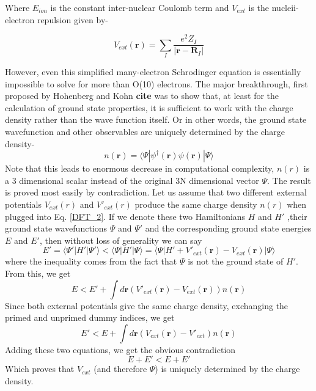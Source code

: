 \documentclass[12pt,letter]{article}
\newcommand{\Ps}{\Psi}
\newcommand{\ps}{\psi}
\newcommand{\da}{\dagger}
\newcommand{\la}{\langle}
\newcommand{\ra}{\rangle}
\newcommand{\rmb}{\mathbf{r}}
\begin{document}
Where $E_{ion}$ is the constant inter-nuclear Coulomb term and $V_{ext}$ is the nucleii-electron repulsion given by-

\begin{equation}
 V_{ext}(\rmb)= \sum_{I} \dfrac{e^2 Z_I}{|\rmb-\mathbf{R}_I|}
 \end{equation} 

However, even this simplified many-electron Schrodinger equation is essentially impossible to solve for more than O(10) electrons. The major breakthrough, first proposed by Hohenberg and Kohn \textbf{cite} was to show that, at least for the calculation of ground state properties, it is sufficient to work with the charge density rather than the wave function itself. Or in other words, the ground state wavefunction and other observables are uniquely determined  by the charge density-
\begin{equation}
n(\rmb)= \la \Ps|\ps^\da (\rmb) \ps(\rmb) | \Ps\ra 
\end{equation}
Note that this leads to enormous decrease in computational complexity, $n(r)$ is a 3 dimensional scalar instead of the original 3N dimensional vector $\Ps$.  The result is proved most easily by contradiction. Let us assume that two different external potentials $V_{ext} (r)$ and $V'_{ext} (r)$ produce the same charge density $n(r)$
when plugged into Eq. \ref{DFT_2}. If we denote these two Hamiltonians $H$ and $H'$ ,their ground state wavefunctions $\Ps$ and $\Ps'$ and the corresponding ground state energies $E$ and $E'$, then without loss of generality we can say
\begin{equation}
E'=\la \Ps' | H' |\Ps' \ra < \la \Ps | H' |\Ps \ra = \la \Ps | H' + V'_{ext} (\rmb) -V_{ext} (\rmb)   |\Ps \ra
\end{equation}
where the inequality comes from the fact that $\Ps$ is not the ground state of $H'$. From this, we get
\begin{equation}
E < E' + \int d\rmb \left( V'_{ext} (\rmb) -V_{ext}(\rmb) \right) n(\rmb)
\end{equation}
Since both external potentials give the same charge density, exchanging the primed and unprimed dummy indices, we get
\begin{equation}
E' < E + \int d\rmb \left( V_{ext} (\rmb) -V'_{ext} \right) n(\rmb)
\end{equation}
Adding these two equations, we get the obvious contradiction
\begin{equation}
E+E' < E+E'
\end{equation}
 Which proves that $V_{ext}$ (and therefore $\Ps$) is uniquely determined by the charge density.
\end{document}
